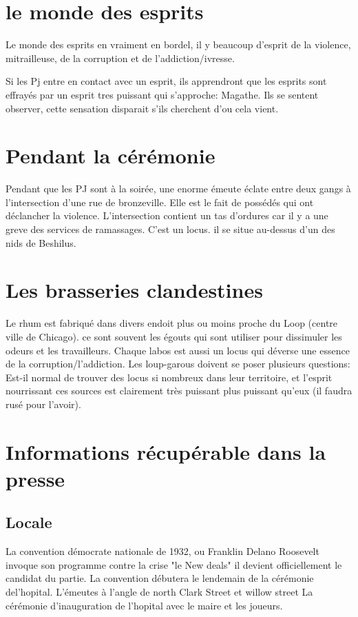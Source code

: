 \documentclass[oneside,12pt]{book}
\begin{document}
\begin{flushleft}
\section{le monde des esprits}
Le monde des esprits en vraiment en bordel, il y beaucoup d'esprit de la violence, mitrailleuse, de la corruption et de l'addiction/ivresse.

Si les Pj entre en contact avec un esprit, ils apprendront que les esprits sont effrayés par un esprit tres puissant qui s'approche: Magathe.
Ils se sentent observer, cette sensation disparait s'ils cherchent d'ou cela vient.

\section{Pendant la cérémonie}
Pendant que les PJ sont à la soirée, une enorme émeute éclate entre deux gangs à l'intersection d'une rue de bronzeville.
Elle est le fait de possédés qui ont déclancher la violence. L'intersection contient un tas d'ordures car il y a une greve des services de ramassages.
C'est un locus. il se situe au-dessus d'un des nids de Beshilus.

\section{Les brasseries clandestines }
Le rhum est fabriqué dans divers endoit plus ou moins proche du Loop (centre ville de Chicago). ce sont souvent les égouts qui sont utiliser pour dissimuler les odeurs et les travailleurs. 
Chaque labos est aussi un locus qui déverse une essence de la corruption/l'addiction. Les loup-garous doivent se poser plusieurs questions:
Est-il normal de trouver des locus si nombreux dans leur territoire, et l'esprit nourrissant ces sources est clairement très puissant plus puissant qu'eux (il faudra rusé pour l'avoir). 

\section{Informations récupérable dans la presse}
    \subsection{Locale}
        La convention démocrate nationale de 1932, ou Franklin Delano Roosevelt invoque son programme contre la crise "le New deals" il devient officiellement le candidat du partie. La convention débutera le lendemain de la cérémonie del'hopital.  
        L'émeutes à l'angle de north Clark Street et willow street 
        La cérémonie d'inauguration de l'hopital avec le maire et les joueurs. 


\end{flushleft}
\end{document}
